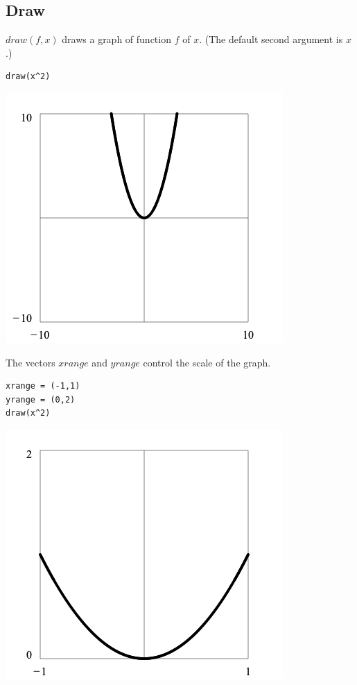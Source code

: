 \subsection{Draw}

$draw(f,x)$ draws a graph of function $f$ of $x$.
(The default second argument is $x$.)

{\color{blue}
\begin{verbatim}
draw(x^2)
\end{verbatim}
}

\begin{center}
\includegraphics[scale=0.5]{parabola1.png}
\end{center}

\noindent
The vectors $xrange$ and $yrange$ control the scale of the graph.

{\color{blue}
\begin{verbatim}
xrange = (-1,1)
yrange = (0,2)
draw(x^2)
\end{verbatim}
}

\begin{center}
\includegraphics[scale=0.5]{parabola2.png}
\end{center}

